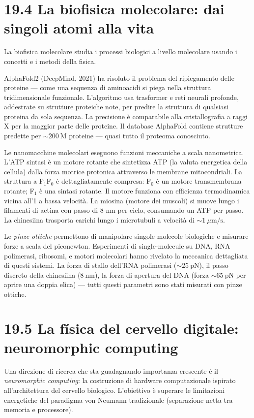 \documentclass[11.5pt,a4paper,openany]{book}
\theoremstyle{remark}
\begin{document}
\section{19.4 La biofisica molecolare: dai singoli atomi alla vita}

La biofisica molecolare studia i processi biologici a livello molecolare usando i concetti e i metodi della fisica.

AlphaFold2 (DeepMind, 2021) ha risoluto il problema del ripiegamento delle proteine --- come una sequenza di aminoacidi si piega nella struttura tridimensionale funzionale. L'algoritmo usa trasformer e reti neurali profonde, addestrate su strutture proteiche note, per predire la struttura di qualsiasi proteina da sola sequenza. La precisione è comparabile alla cristallografia a raggi X per la maggior parte delle proteine. Il database AlphaFold contiene strutture predette per $\sim 200\ \text{M}$ proteine --- quasi tutto il proteoma conosciuto.

Le nanomacchine molecolari eseguono funzioni meccaniche a scala nanometrica. L'ATP sintasi è un motore rotante che sintetizza ATP (la valuta energetica della cellula) dalla forza motrice protonica attraverso le membrane mitocondriali. La struttura a F$_1$F$_0$ è dettagliatamente compresa: F$_0$ è un motore transmembrana rotante; F$_1$ è una sintasi rotante. Il motore funziona con efficienza termodinamica vicina all'1 a bassa velocità. La miosina (motore dei muscoli) si muove lungo i filamenti di actina con passo di 8 nm per ciclo, consumando un ATP per passo. La chinesiina trasporta carichi lungo i microtubuli a velocità di $\sim 1\ \mu\text{m/s}$.

Le \textit{pinze ottiche} permettono di manipolare singole molecole biologiche e misurare forze a scala del piconewton. Esperimenti di single-molecule su DNA, RNA polimerasi, ribosomi, e motori molecolari hanno rivelato la meccanica dettagliata di questi sistemi. La forza di stallo dell'RNA polimerasi ($\sim 25\ \text{pN}$), il passo discreto della chinesiina ($8\ \text{nm}$), la forza di apertura del DNA (forza $\sim 65\ \text{pN}$ per aprire una doppia elica) --- tutti questi parametri sono stati misurati con pinze ottiche.

\section{19.5 La física del cervello digitale: neuromorphic computing}

Una direzione di ricerca che sta guadagnando importanza crescente è il \textit{neuromorphic computing}: la costruzione di hardware computazionale ispirato all'architettura del cervello biologico. L'obiettivo è superare le limitazioni energetiche del paradigma von Neumann tradizionale (separazione netta tra memoria e processore).
\end{document}
